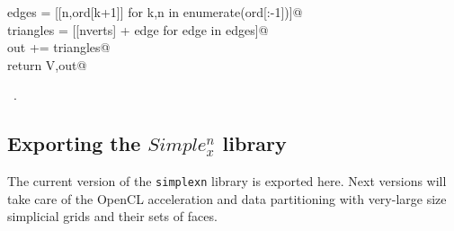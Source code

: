 \documentclass[11pt,oneside]{article}	%
\begin{document}
\begin{flushleft}
\begin{list}{}{}
\mbox{}\verb@      edges = [[n,ord[k+1]] for k,n in enumerate(ord[:-1])]@\\
\mbox{}\verb@      triangles = [[nverts] + edge for edge in edges]@\\
\mbox{}\verb@      out += triangles@\\
\mbox{}\verb@   return V,out@\\
\mbox{}\verb@@{\NWsep}
\end{list}
\vspace{-1ex}
\footnotesize\addtolength{\baselineskip}{-1ex}
\begin{list}{}{\setlength{\itemsep}{-\parsep}\setlength{\itemindent}{-\leftmargin}}
\item \NWtxtMacroRefIn\ .
\end{list}
\end{flushleft}


\subsection{Exporting the $Simple_x^n$ library}
The current version of the \texttt{simplexn} library is exported here. Next versions will take care of the OpenCL acceleration and data partitioning with very-large size simplicial grids and their sets of faces.
\end{document}
